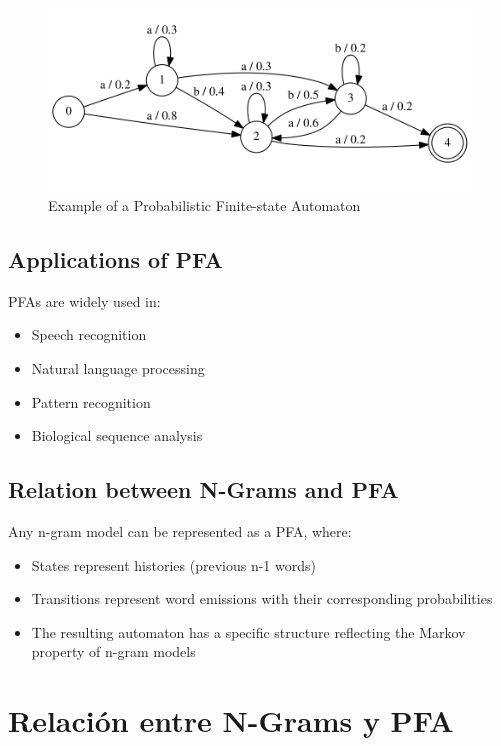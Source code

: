 \begin{figure}[htbp]
   \centering
   \includegraphics{images/07/pfaExample.png}
   \caption{Example of a Probabilistic Finite-state Automaton}
   \label{fig:07/pfaExample}
\end{figure}

\subsection{Applications of PFA}

PFAs are widely used in:
\begin{itemize}
   \item Speech recognition
   \item Natural language processing
   \item Pattern recognition
   \item Biological sequence analysis
\end{itemize}

\subsection{Relation between N-Grams and PFA}

Any n-gram model can be represented as a PFA, where:
\begin{itemize}
   \item States represent histories (previous n-1 words)
   \item Transitions represent word emissions with their corresponding probabilities
   \item The resulting automaton has a specific structure reflecting the Markov property of n-gram models
\end{itemize}


\section{Relación entre N-Grams y PFA}

